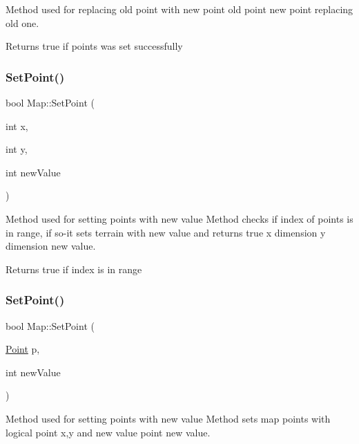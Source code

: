 Method used for replacing old point with new point  old point  new point replacing old one. 

\begin{DoxyReturn}{Returns}
true if points was set successfully 
\end{DoxyReturn}
\mbox{\label{class_map_a6456ee3beb19614b6ae03a04414d048a}} 
\subsubsection{\texorpdfstring{Set\+Point()}{SetPoint()}\hspace{0.1cm}{\footnotesize\ttfamily [1/3]}}
{\footnotesize\ttfamily bool Map\+::\+Set\+Point (\begin{DoxyParamCaption}\item[{int}]{x,  }\item[{int}]{y,  }\item[{int}]{new\+Value }\end{DoxyParamCaption})}



Method used for setting points with new value Method checks if index of point\textquotesingle{}s is in range, if so-\/it set\textquotesingle{}s terrain with new value and returns true  x dimension  y dimension  new value. 

\begin{DoxyReturn}{Returns}
true if index is in range 
\end{DoxyReturn}
\mbox{\label{class_map_a68903a79aac7c1680b59329ff1b14579}} 
\subsubsection{\texorpdfstring{Set\+Point()}{SetPoint()}\hspace{0.1cm}{\footnotesize\ttfamily [2/3]}}
{\footnotesize\ttfamily bool Map\+::\+Set\+Point (\begin{DoxyParamCaption}\item[{\mbox{\hyperlink{class_point}{Point}}}]{p,  }\item[{int}]{new\+Value }\end{DoxyParamCaption})}



Method used for setting points with new value Method sets map points with logical point x,y and new value  point  new value. 

